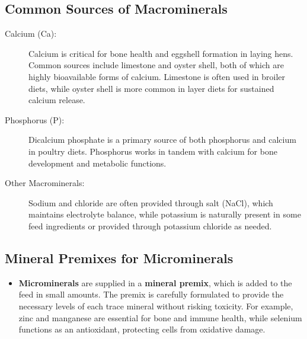 \documentclass[a4paper,12pt]{article}
\begin{document}
\subsection{Common Sources of Macrominerals}
\begin{description}
	\item[Calcium (Ca):] Calcium is critical for bone health and eggshell formation in laying
hens. Common sources include limestone and oyster shell, both of which are
highly bioavailable forms of calcium. Limestone is often used in broiler diets,
while oyster shell is more common in layer diets for sustained calcium release.
	\item[Phosphorus (P):] Dicalcium phosphate is a primary source of both phosphorus
and calcium in poultry diets. Phosphorus works in tandem with calcium for bone
development and metabolic functions.
	\item[Other Macrominerals:] Sodium and chloride are often provided through salt
(NaCl), which maintains electrolyte balance, while potassium is naturally present
in some feed ingredients or provided through potassium chloride as needed.
\end{description}

\subsection{Mineral Premixes for Microminerals}
\begin{itemize}
	\item \textbf{Microminerals} are supplied in a\textbf{ mineral premix}, which is added to the feed in small amounts. The premix is carefully formulated to provide the necessary
levels of each trace mineral without risking toxicity. For example, zinc and
manganese are essential for bone and immune health, while selenium functions
as an antioxidant, protecting cells from oxidative damage.
\end{itemize}
\end{document}
